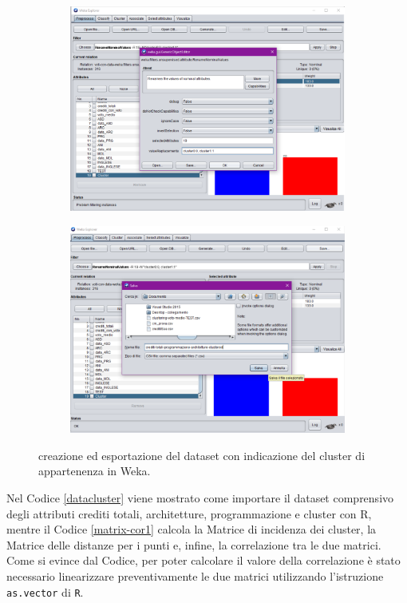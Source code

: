 \documentclass[12pt]{article}
\begin{document}
\begin{figure}
	\begin{subfigure}[b]{0.496\textwidth}
		\includegraphics[width=\textwidth]{img/save-cluster-ass-3.pdf}
		\end{subfigure}
		\begin{subfigure}[b]{0.496\textwidth}
		\includegraphics[width=\textwidth]{img/save-cluster-ass-4.pdf}
		\end{subfigure}
		\caption{creazione ed esportazione del dataset con indicazione del cluster di appartenenza in Weka.}
		\label{fig:add-cluster}
\end{figure}
\newpage
Nel Codice \ref{datacluster} viene mostrato come importare il dataset comprensivo degli attributi crediti totali, architetture, programmazione e cluster con R, mentre il Codice \ref{matrix-cor1} calcola la Matrice di incidenza dei cluster, la Matrice delle distanze per i punti e, infine, la correlazione tra le due matrici. 
Come si evince dal Codice, per poter calcolare il valore della correlazione è stato necessario linearizzare preventivamente le due matrici utilizzando l'istru\-zione \texttt{as.vector} di \texttt{R}.
\end{document}
